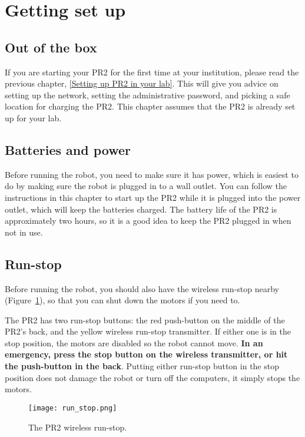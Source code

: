 \section{Getting set up}
\subsection{Out of the box}
If you are starting your PR2 for the first time at your institution, please read the previous chapter, \ref{Setting up PR2 in your lab}.  
This will give you advice on setting up the network, setting the administrative password, and picking a safe location for 
charging the PR2.  This chapter assumes that the PR2 is already set up for your lab.
\subsection{Batteries and power}
Before running the robot, you need to make sure it has power, which is easiest to do by making sure the robot is plugged in to a wall outlet. You can follow the instructions in this chapter to start up the PR2 while it is plugged into the power outlet, which will keep the batteries charged.  The battery life of the PR2 is approximately two hours, so it is a good idea to keep the PR2 plugged in when not in use.  


\subsection{Run-stop}
Before running the robot, you should also have the wireless run-stop 
nearby (Figure~\ref{fig:runstop}), so that you can shut down the motors if you need to. 

The PR2 has two run-stop buttons: the red push-button on the middle of the PR2's back, and 
the yellow wireless run-stop transmitter. If either one is in the stop position, the motors are disabled so the
robot cannot move. {\bf In an emergency, press the stop button on the wireless transmitter, or
hit the push-button in the back}. Putting either run-stop button in the stop position does not
damage the robot or turn off the computers, it simply stops the motors.


\begin{figure}[h]
\centering
\texttt{[image: run\_stop.png]}
\caption{The PR2 wireless run-stop.}
\label{fig:runstop}
\end{figure}

